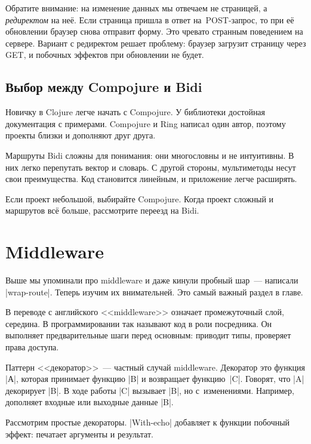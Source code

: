 
Обратите внимание: на изменение данных мы отвечаем не страницей, а
\emph{редиректом} на не\"{е}. Если страница пришла в ответ на~POST-запрос, то
при е\"{е} обновлении браузер снова отправит форму. Это чревато странным
поведением на сервере. Вариант с редиректом решает проблему: браузер загрузит
страницу через GET, и побочных эффектов при обновлении не будет.

\subsection{Выбор между Compojure и Bidi}

Новичку в Clojure легче начать с Compojure. У библиотеки достойная документация
с примерами. Compojure и Ring написал один автор, поэтому проекты близки и
дополняют друг друга.

Маршруты Bidi сложны для понимания: они многословны и не интуитивны. В них легко
перепутать вектор и словарь. С другой стороны, мультиметоды несут свои
преимущества. Код становится линейным, и приложение легче расширять.

Если проект небольшой, выбирайте Compojure. Когда проект сложный и маршрутов вс\"{е}
больше, рассмотрите переезд на Bidi.

\section{Middleware}


Выше мы упоминали про middleware и даже кинули пробный шар~--- написали
\spverb|wrap-route|. Теперь изучим их внимательней. Это самый важный раздел в
главе.

В переводе с английского <<middleware>> означает промежуточный слой, середина. В
программировании так называют код в роли посредника. Он выполняет
предварительные шаги перед основным: приводит типы, проверяет права доступа.

\label{decorator}


Паттерн <<декоратор>>~--- частный случай middleware. Декоратор это функция
\spverb|А|, которая принимает функцию \spverb|B| и возвращает
функцию~\spverb|C|. Говорят, что \spverb|A| декорирует \spverb|B|. В ходе работы
\spverb|C| вызывает \spverb|B|, но с~изменениями. Например, дополняет входные
или выходные данные \spverb|B|.

Рассмотрим простые декораторы. \spverb|With-echo| добавляет к функции побочный
эффект: печатает аргументы и результат.

